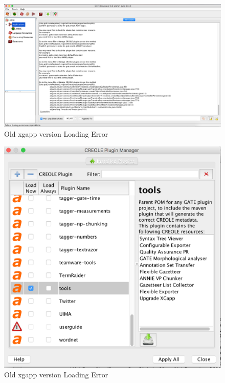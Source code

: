 \begin{figure}[htb]
\begin{center}
\includegraphics[scale=0.5]{old-xgapp-error.png}
\end{center}
\caption{Old xgapp version Loading Error}
\label{fig:oldxgapp}
\end{figure}

\begin{figure}[htb]
\begin{center}
\includegraphics[scale=0.5]{plugin-manager-tools.png}
\end{center}
\caption{Old xgapp version Loading Error}
\label{fig:pr-init-params}
\end{figure}


